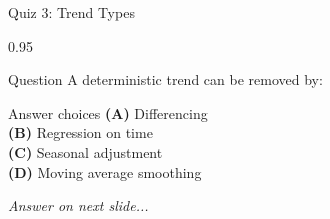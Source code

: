 \documentclass[9pt, aspectratio=169, t]{beamer}
\begin{document}
\begin{frame}{Quiz 3: Trend Types}
    \begin{cminipage}{0.95\textwidth}
    \begin{alertblock}{Question}
        A deterministic trend can be removed by:
    \end{alertblock}

    \vspace{0.4cm}

    \begin{block}{Answer choices}
        \textcolor{MainBlue}{\textbf{(A)}} Differencing\\[3pt]
        \textcolor{MainBlue}{\textbf{(B)}} Regression on time\\[3pt]
        \textcolor{MainBlue}{\textbf{(C)}} Seasonal adjustment\\[3pt]
        \textcolor{MainBlue}{\textbf{(D)}} Moving average smoothing
    \end{block}

    \vspace{0.5cm}

    \begin{center}
        \textit{Answer on next slide...}
    \end{center}
    \end{cminipage}
\end{frame}
\end{document}
